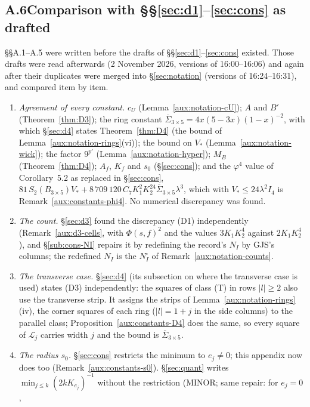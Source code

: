 \subsection*{A.6\quad Comparison with \S\S\ref{sec:d1}--\ref{sec:cons} as drafted}

\S\S A.1--A.5 were written before the drafts of \S\S\ref{sec:d1}--\ref{sec:cons} existed.  Those
drafts were read afterwards (2 November 2026, versions of 16:00--16:06) and again after their
duplicates were merged into \S\ref{sec:notation} (versions of 16:24--16:31), and compared item by
item.
\begin{enumerate}
\item[(C1)] \emph{Agreement of every constant.}  $c_U$ (Lemma~\ref{aux:notation-cU}); $A$ and $B'$
(Theorem~\ref{thm:D3}); the ring constant $\overline\Sigma_{3\times5}=4x(5-3x)(1-x)^{-2}$, with
which \S\ref{sec:d4} states Theorem~\ref{thm:D4} (the bound of
Lemma~\ref{aux:notation-rings}(vi)); the bound on
$V_*$ (Lemma~\ref{aux:notation-wick}); the factor $9^{p'}$ (Lemma~\ref{aux:notation-hyper}); $M_B$
(Theorem~\ref{thm:D4}); $A_f$, $K_f$ and $s_0$ (\S\ref{sec:cons}); and the $\varphi^4$ value of
Corollary~5.2 as replaced in \S\ref{sec:cons},
$81\,S_2(B_{3\times5})V_*+8\,709\,120\,C_7K_1^2K_2^{24}\overline\Sigma_{3\times5}\lambda^3$, which with
$V_*\le24\lambda^2I_4$ is Remark~\ref{aux:constants-phi4}.  No numerical discrepancy was found.
\item[(C2)] \emph{The count.}  \S\ref{sec:d3} found the discrepancy (D1) independently
(Remark~\ref{aux:d3-cells}, with $\Phi(s,f)^2$ and the values $3K_1K_2^4$ against $2K_1K_2^4$),
and \S\ref{sub:cons-NI} repairs it by redefining the record's $N_I$ by GJS's columns; the
redefined $N_I$ is the $N^{\square}_I$ of Remark~\ref{aux:notation-counts}.
\item[(C3)] \emph{The transverse case.}  \S\ref{sec:d4} (its subsection on where the transverse
case is used) states (D3) independently: the squares of class (T) in rows $|l|\ge2$ also use the
transverse strip.  It assigns the strips of Lemma~\ref{aux:notation-rings}(iv), the corner
squares of each ring ($|l|=1+j$ in the side columns) to the parallel class;
Proposition~\ref{aux:constants-D4} does the same, so every square of $\mathcal L_j$ carries width
$j$ and the bound is $\overline\Sigma_{3\times5}$.
\item[(C4)] \emph{The radius $s_0$.}  \S\ref{sec:cons} restricts the minimum to $e_j\ne0$; this
appendix now does too (Remark~\ref{aux:constants-s0}).  \S\ref{sec:quant} writes
$\min_{j\le k}(2kK_{e_j})^{-1}$ without the restriction (MINOR; same repair: for $e_j=0$,

\end{enumerate}
